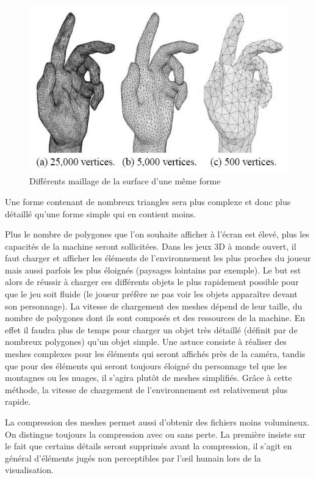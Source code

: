 \documentclass[a4paper, 11pt]{article} %
\begin{document}
\begin{figure}[!h]%
\includegraphics[width=\columnwidth]{images/meshes.jpg}%
\caption{Différents maillage de la surface d'une même forme}%
\label{}%
\end{figure}

Une forme contenant de nombreux triangles sera plus complexe et donc plus détaillé qu'une forme simple qui en contient moins.

Plus le nombre de polygones que l'on souhaite afficher à l'écran est élevé, plus les capacités de la machine seront sollicitées. Dans les jeux 3D à monde ouvert, il faut charger et afficher les éléments de l'environnement les plus proches du joueur mais aussi parfois les plus éloignés (paysages lointains par exemple). Le but est alors de réussir à charger ces différents objets le plus rapidement possible pour que le jeu soit fluide (le joueur préfère ne pas voir les objets apparaître devant son personnage). La vitesse de chargement des meshes dépend de leur taille, du nombre de polygones dont ils sont composés et des ressources de la machine. En effet il faudra plus de temps pour charger un objet très détaillé (définit par de nombreux polygones) qu'un objet simple. Une astuce consiste à réaliser des meshes complexes pour les éléments qui seront affichés près de la caméra, tandis que pour des éléments qui seront toujours éloigné du personnage tel que les montagnes ou les nuages, il s'agira plutôt de meshes simplifiés. Grâce à cette méthode, la vitesse de chargement de l'environnement est relativement plus rapide.

La compression des meshes permet aussi d'obtenir des fichiers moins volumineux. On distingue toujours la compression avec ou sans perte. La première insiste sur le fait que certains détails seront supprimés avant la compression, il s'agit en général d'éléments jugés non perceptibles par l’œil humain lors de la visualisation. 
\end{document}
